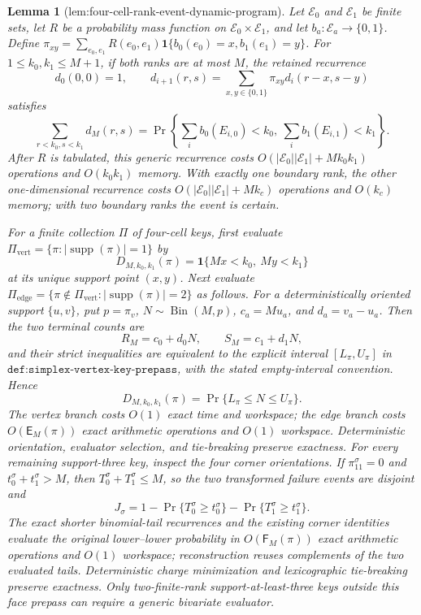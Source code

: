 \documentclass{article}
\newtheorem{lemma}{Lemma}
\begin{document}
\begin{lemma}[lem:four-cell-rank-event-dynamic-program]\label{lem:four-cell-rank-event-dynamic-program}
Let \(\mathscr E_0\) and \(\mathscr E_1\) be finite sets, let \(R\) be a probability mass function on \(\mathscr E_0\times\mathscr E_1\), and let \(b_a:\mathscr E_a\to\{0,1\}\). Define \(\pi_{xy}=\sum_{e_0,e_1}R(e_0,e_1)\mathbf 1\{b_0(e_0)=x,b_1(e_1)=y\}\). For \(1\le k_0,k_1\le M+1\), if both ranks are at most \(M\), the retained recurrence
\[
d_0(0,0)=1,\qquad
d_{i+1}(r,s)=\sum_{x,y\in\{0,1\}}\pi_{xy}d_i(r-x,s-y)
\]
satisfies
\[
\sum_{r<k_0,s<k_1}d_M(r,s)
=\Pr\!\left\{\sum_i b_0(E_{i,0})<k_0,\ \sum_i b_1(E_{i,1})<k_1\right\}.
\]
After \(R\) is tabulated, this generic recurrence costs \(O(|\mathscr E_0||\mathscr E_1|+Mk_0k_1)\) operations and \(O(k_0k_1)\) memory. With exactly one boundary rank, the other one-dimensional recurrence costs \(O(|\mathscr E_0||\mathscr E_1|+Mk_c)\) operations and \(O(k_c)\) memory; with two boundary ranks the event is certain.

For a finite collection \(\Pi\) of four-cell keys, first evaluate \(\Pi_{\mathrm{vert}}=\{\pi:|\operatorname{supp}(\pi)|=1\}\) by
\[
D_{M,k_0,k_1}(\pi)=\mathbf 1\{Mx<k_0,\ My<k_1\}
\]
at its unique support point \((x,y)\). Next evaluate \(\Pi_{\mathrm{edge}}=\{\pi\notin\Pi_{\mathrm{vert}}:|\operatorname{supp}(\pi)|=2\}\) as follows. For a deterministically oriented support \(\{u,v\}\), put \(p=\pi_v\), \(N\sim\operatorname{Bin}(M,p)\), \(c_a=Mu_a\), and \(d_a=v_a-u_a\). Then the two terminal counts are
\[
R_M=c_0+d_0N,\qquad S_M=c_1+d_1N,
\]
and their strict inequalities are equivalent to the explicit interval \([L_\pi,U_\pi]\) in \(\texttt{def:simplex-vertex-key-prepass}\), with the stated empty-interval convention. Hence
\[
D_{M,k_0,k_1}(\pi)=\Pr\{L_\pi\le N\le U_\pi\}.
\]
The vertex branch costs \(O(1)\) exact time and workspace; the edge branch costs \(O(\mathsf E_M(\pi))\) exact arithmetic operations and \(O(1)\) workspace. Deterministic orientation, evaluator selection, and tie-breaking preserve exactness. For every remaining support-three key, inspect the four corner orientations. If \(\pi^\sigma_{11}=0\) and \(t_0^\sigma+t_1^\sigma>M\), then \(T_0^\sigma+T_1^\sigma\le M\), so the two transformed failure events are disjoint and
\[
J_\sigma=1-\Pr\{T_0^\sigma\ge t_0^\sigma\}
-\Pr\{T_1^\sigma\ge t_1^\sigma\}.
\]
The exact shorter binomial-tail recurrences and the existing corner identities evaluate the original lower--lower probability in \(O(\mathsf F_M(\pi))\) exact arithmetic operations and \(O(1)\) workspace; reconstruction reuses complements of the two evaluated tails. Deterministic charge minimization and lexicographic tie-breaking preserve exactness. Only two-finite-rank support-at-least-three keys outside this face prepass can require a generic bivariate evaluator.


\end{lemma}
\end{document}
